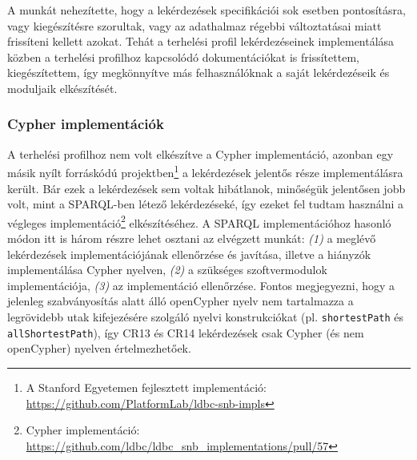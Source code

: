 A munkát nehezítette, hogy a lekérdezések specifikációi sok esetben pontosításra, vagy kiegészítésre szorultak, vagy az adathalmaz régebbi változtatásai miatt frissíteni kellett azokat. Tehát a terhelési profil lekérdezéseinek implementálása közben a terhelési profilhoz kapcsolódó dokumentációkat is frissítettem, kiegészítettem, így megkönnyítve más felhasználóknak a saját lekérdezéseik és moduljaik elkészítését.

\subsubsection{Cypher implementációk}

A terhelési profilhoz nem volt elkészítve a Cypher implementáció, azonban egy másik nyílt forráskódú projektben\footnote{A Stanford Egyetemen fejlesztett implementáció: \url{https://github.com/PlatformLab/ldbc-snb-impls}} a lekérdezések jelentős része implementálásra került. Bár ezek a lekérdezések sem voltak hibátlanok, minőségük jelentősen jobb volt, mint a SPARQL-ben létező lekérdezéseké, így ezeket fel tudtam használni a végleges implementáció\footnote{Cypher implementáció: \url{https://github.com/ldbc/ldbc_snb_implementations/pull/57}} elkészítéséhez. A SPARQL implementációhoz hasonló módon itt is három részre lehet osztani az elvégzett munkát: \textit{(1)} a meglévő lekérdezések implementációjának ellenőrzése és javítása, illetve a hiányzók implementálása Cypher nyelven, \textit{(2)} a szükséges szoftvermodulok implementációja, \textit{(3)} az implementáció ellenőrzése. Fontos megjegyezni, hogy a jelenleg szabványosítás alatt álló openCypher nyelv nem tartalmazza a legrövidebb utak kifejezésére szolgáló nyelvi konstrukciókat (pl. \texttt{shortestPath} és \texttt{allShortestPath}), így CR13 és CR14 lekérdezések csak Cypher (és nem openCypher) nyelven értelmezhetőek.

